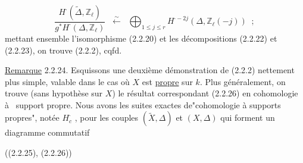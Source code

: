 \begin{equation}\tag{2.2.23}
\frac{H^{\cdot}(\widetilde{\Delta},\mathbb{Z}_{\ell})}{g^{*}H^{\cdot}(\Delta,\mathbb{Z}_{\ell})} \;\;\stackrel{\sim}{\longleftarrow}\;\; \bigoplus_{1\leq j\leq r} H^{\cdot-2j}(\Delta,\mathbb{Z}_{\ell}(-j)) \;\;;
\end{equation}
mettant ensemble l'isomorphisme (2.2.20) et les décompositions (2.2.22) et (2.2.23), on trouve (2.2.2), cqfd.

\underline{Remarque} 2.2.24. \quad Esquissons une deuxième démonstration de (2.2.2) nettement plus simple, valable dans le cas où $X$ est \underline{propre} sur $k$. Plus généralement, on trouve (sans hypothèse sur $X$) le résultat correspondant (2.2.26) en cohomologie à \ support propre. Nous avons les suites exactes de"cohomologie à supports propres", notée $H^{\cdot}_{c}$ , pour les couples $(\widetilde{X},\Delta)$ et $(X,\Delta)$ qui forment un diagramme commutatif 



((2.2.25), (2.2.26))

